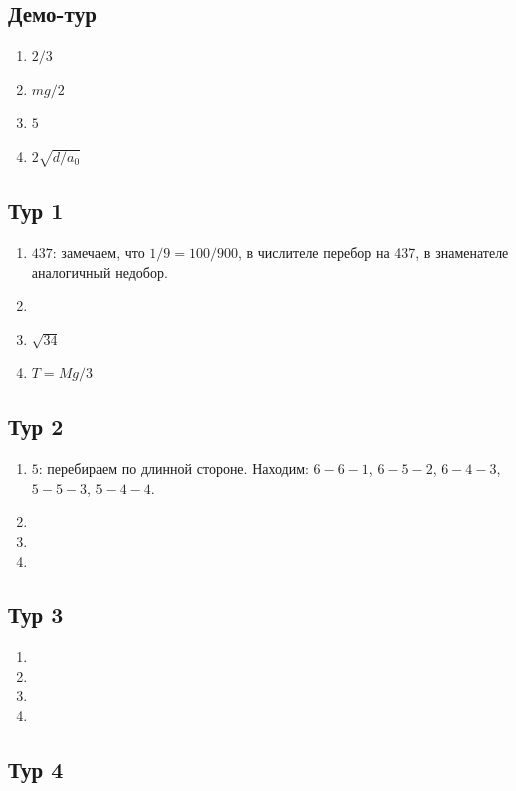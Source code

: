 \documentclass[12pt]{article} %
\begin{document}
\subsection*{Демо-тур}

\begin{enumerate}
\item $2/3$
\item $mg/2$
\item $5$
\item $2\sqrt{d/a_0}$
\end{enumerate}

\subsection*{Тур 1}

\begin{enumerate}
\item $437$: замечаем, что $1/9=100/900$, в числителе перебор на 437, в знаменателе аналогичный недобор.
\item 
\item $\sqrt{34}$
\item $T=Mg/3$
\end{enumerate}

\subsection*{Тур 2}

\begin{enumerate}
\item $5$: перебираем по длинной стороне. Находим: $6-6-1$, $6-5-2$, $6-4-3$, $5-5-3$, $5-4-4$.
\item 
\item 
\item 
\end{enumerate}

\subsection*{Тур 3}

\begin{enumerate}
\item 
\item 
\item 
\item 
\end{enumerate}

\subsection*{Тур 4}
\end{document}
